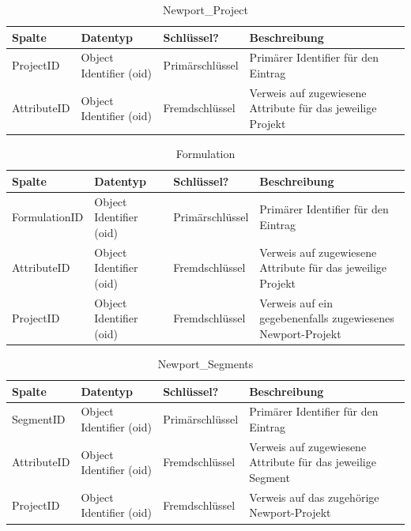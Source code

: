 \begin{table}[H]
    \centering
    \caption{Newport\_Project}
    \begin{tabularx}{\textwidth}{l l l X}
        \toprule
        \textbf{Spalte} & \textbf{Datentyp} & \textbf{Schlüssel?} & \textbf{Beschreibung} \\
        \midrule
        ProjectID & Object Identifier (oid) & Primärschlüssel & Primärer Identifier für den Eintrag \\
        AttributeID & Object Identifier (oid) & Fremdschlüssel & Verweis auf zugewiesene Attribute für das jeweilige Projekt \\
        \bottomrule
    \end{tabularx}
    \label{tab:newport_project}
\end{table}

\begin{table}[H]
    \centering
    \caption{Formulation}
    \begin{tabularx}{\textwidth}{l l l X}
        \toprule
        \textbf{Spalte} & \textbf{Datentyp} & \textbf{Schlüssel?} & \textbf{Beschreibung} \\
        \midrule
        FormulationID & Object Identifier (oid) & Primärschlüssel & Primärer Identifier für den Eintrag\\
        AttributeID & Object Identifier (oid) & Fremdschlüssel & Verweis auf zugewiesene Attribute für das jeweilige Projekt\\
        ProjectID & Object Identifier (oid) & Fremdschlüssel & Verweis auf ein gegebenenfalls zugewiesenes Newport-Projekt\\
        \bottomrule
    \end{tabularx}
    \label{tab:formulation}
\end{table}

\begin{table}[H]
    \centering
    \caption{Newport\_Segments}
    \begin{tabularx}{\textwidth}{l l l X}
        \toprule
        \textbf{Spalte} & \textbf{Datentyp} & \textbf{Schlüssel?} & \textbf{Beschreibung} \\
        \midrule
        SegmentID & Object Identifier (oid) & Primärschlüssel & Primärer Identifier für den Eintrag\\
        AttributeID & Object Identifier (oid) & Fremdschlüssel & Verweis auf zugewiesene Attribute für das jeweilige Segment\\
        ProjectID & Object Identifier (oid) & Fremdschlüssel & Verweis auf das zugehörige Newport-Projekt\\
        \bottomrule
    \end{tabularx}
    \label{tab:newport_segments}
\end{table}

